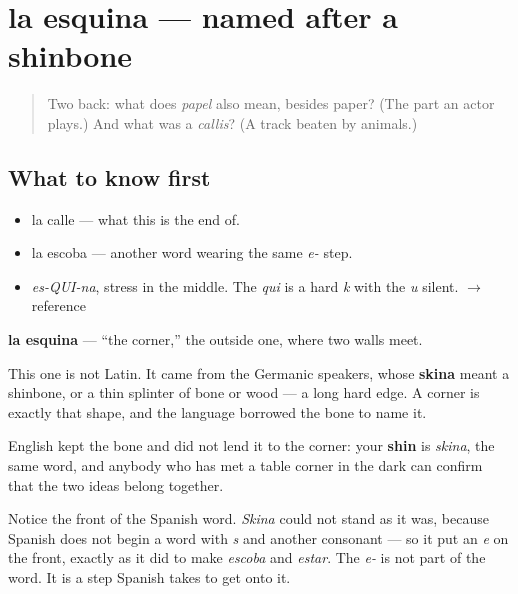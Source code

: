 \section[la esquina]{la esquina — named after a shinbone}

\label{lesson:ES-C302-esquina}



\begin{quote}
Two back: what does \emph{papel} also mean, besides paper? (The part an actor plays.) And what was a \emph{callis}? (A track beaten by animals.)
\end{quote}

\subsection*{What to know first}
\begin{itemize}
\raggedright
  \item la calle — what this is the end of.
  \item la escoba — another word wearing the same \emph{e-} step.
\end{itemize}

\begin{sounds}
\begin{itemize}
\raggedright
  \item \emph{es-QUI-na}, stress in the middle. The \emph{qui} is a hard \emph{k} with the \emph{u} silent. $\to$ reference
\end{itemize}
\end{sounds}

\begin{cousinweb}
\textbf{la esquina} — \textquotedblleft{}the corner,\textquotedblright{} the outside one, where two walls meet.

This one is not Latin. It came from the Germanic speakers, whose \textbf{skina} meant a shinbone, or a thin splinter of bone or wood — a long hard edge. A corner is exactly that shape, and the language borrowed the bone to name it.

English kept the bone and did not lend it to the corner: your \textbf{shin} is \emph{skina}, the same word, and anybody who has met a table corner in the dark can confirm that the two ideas belong together.

Notice the front of the Spanish word. \emph{Skina} could not stand as it was, because Spanish does not begin a word with \emph{s} and another consonant — so it put an \emph{e} on the front, exactly as it did to make \emph{escoba} and \emph{estar}. The \emph{e-} is not part of the word. It is a step Spanish takes to get onto it.
\end{cousinweb}

